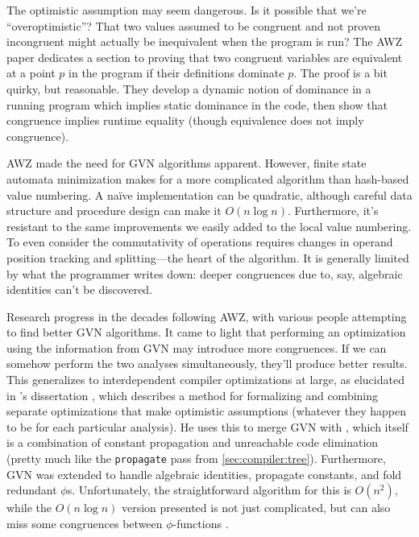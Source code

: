 The optimistic assumption may seem dangerous.  Is it possible that we're
``overoptimistic''?  That two values assumed to be congruent and not proven
incongruent might actually be inequivalent when the program is run?  The AWZ
paper dedicates a section to proving that two congruent variables are
equivalent at a point $p$ in the program if their definitions dominate $p$.
The proof is a bit quirky, but reasonable.  They develop a dynamic notion of
dominance in a running program which implies static dominance in the code, then
show that congruence implies runtime equality (though equivalence does not
imply congruence).

AWZ made the need for \acrfull{GVN} algorithms apparent.  However, finite state
automata minimization makes for a more complicated algorithm than hash-based
value numbering.  A na\"{i}ve implementation can be quadratic, although careful
data structure and procedure design can make it $O(n\log n)$.  Furthermore,
it's resistant to the same improvements we easily added to the local value
numbering.  To even consider the commutativity of operations requires changes
in operand position tracking and splitting---the heart of the algorithm.  It is
generally limited by what the programmer writes down: deeper congruences due
to, say, algebraic identities can't be discovered.

Research progress in the decades following AWZ, with various people attempting
to find better \gls{GVN} algorithms. It came to light that performing an
optimization using the information from \gls{GVN} may introduce more
congruences.  If we can somehow perform the two analyses simultaneously,
they'll produce better results.  This generalizes to interdependent compiler
optimizations at large, as elucidated in \citeauthor{Click}'s dissertation
\autocite*{Click}, which describes a method for formalizing and combining
separate optimizations that make optimistic assumptions (whatever they happen
to be for each particular analysis).  He uses this to merge \gls{GVN} with
, which itself is a combination of
constant propagation and unreachable code elimination (pretty much like the
\Verb|propagate| pass from \cref{sec:compiler:tree}).  Furthermore, \gls{GVN}
was extended to handle algebraic identities, propagate constants, and fold
redundant $\phi$s.  Unfortunately, the straightforward algorithm for this is
$O(n^2)$, while the $O(n\log n)$ version presented is not just complicated, but
can also miss some congruences between $\phi$-functions
\autocites{Click,Simpson}.

